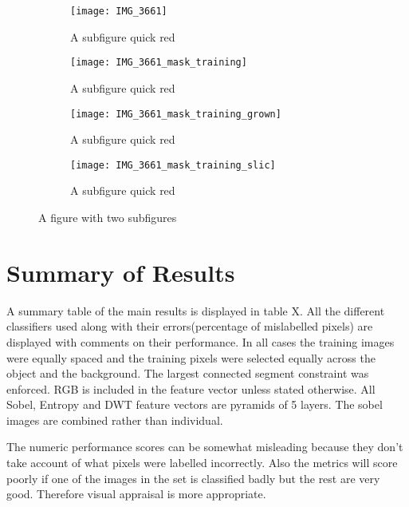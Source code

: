 \documentclass[12pt]{IIBproject}
\begin{document}
\begin{figure}[H]
\centering
\begin{subfigure}{.45\textwidth}
  \centering
  \texttt{[image: IMG\_3661]}
  \caption{A subfigure quick red}
  \label{fig:sub2}
\end{subfigure}
\begin{subfigure}{.45\textwidth}
  \centering
  \texttt{[image: IMG\_3661\_mask\_training]}
  \caption{A subfigure quick red}
  \label{fig:sub2}
\end{subfigure}
\begin{subfigure}{.45\textwidth}
  \centering
  \texttt{[image: IMG\_3661\_mask\_training\_grown]}
  \caption{A subfigure quick red}
  \label{fig:sub2}
\end{subfigure}
\begin{subfigure}{.45\textwidth}
  \centering
  \texttt{[image: IMG\_3661\_mask\_training\_slic]}
  \caption{A subfigure quick red}
  \label{fig:sub2}
\end{subfigure}



\caption{A figure with two subfigures}
\label{fig:test}
\end{figure}









\section{Summary of Results}
A summary table of the main results is displayed in table X. All the different classifiers used along with their errors(percentage of mislabelled pixels) are displayed with comments on their performance. In all cases the training images were equally spaced and the training pixels were selected equally across the object and the background. The largest connected segment constraint was enforced. RGB is included in the feature vector unless stated otherwise. All Sobel, Entropy and DWT feature vectors are pyramids of 5 layers. The sobel images are combined rather than individual.

The numeric performance scores can be somewhat misleading because they don't take account of what pixels were labelled incorrectly. Also the metrics will score poorly if one of the images in the set is classified badly but the rest are very good. Therefore visual appraisal is more appropriate.
\end{document}
